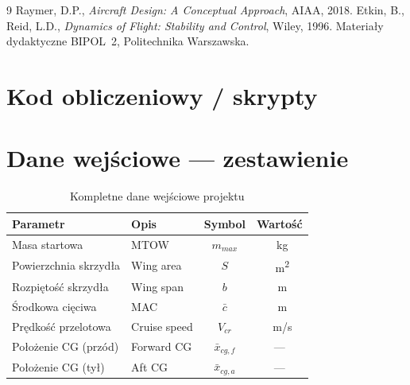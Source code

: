 \documentclass[12pt, a4paper]{article}
\begin{document}
\newpage


\begin{thebibliography}{9}
   Raymer, D.P., \textit{Aircraft Design: A Conceptual Approach}, AIAA, 2018.
   Etkin, B., Reid, L.D., \textit{Dynamics of Flight: Stability and Control}, Wiley, 1996.
   Materiały dydaktyczne BIPOL~2, Politechnika Warszawska.
\end{thebibliography}

\newpage
\appendix
\section{Kod obliczeniowy / skrypty}


\section{Dane wejściowe — zestawienie}

\begin{table}[H]
  \centering
  \caption{Kompletne dane wejściowe projektu}
  \label{tab:dane_wejsciowe}
  \begin{tabular}{llcc}
    \toprule
    \textbf{Parametr} & \textbf{Opis} & \textbf{Symbol} & \textbf{Wartość} \\
    \midrule
    Masa startowa        & MTOW                    & $m_{max}$    & \SI{}{kg}   \\
    Powierzchnia skrzydła & Wing area               & $S$          & \SI{}{m^2}  \\
    Rozpiętość skrzydła  & Wing span               & $b$          & \SI{}{m}    \\
    Środkowa cięciwa     & MAC                     & $\bar{c}$    & \SI{}{m}    \\
    Prędkość przelotowa  & Cruise speed            & $V_{cr}$     & \SI{}{m/s}  \\
    Położenie CG (przód) & Forward CG              & $\bar{x}_{cg,f}$ & ---    \\
    Położenie CG (tył)   & Aft CG                  & $\bar{x}_{cg,a}$ & ---    \\
    \bottomrule
  \end{tabular}
\end{table}
\end{document}

